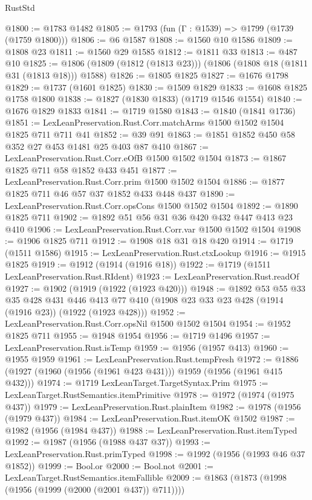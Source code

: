 \begin{lexlean}{RustStd}
\begin{coremodule}
@1800 := @1783 @1482
@1805 := @1793 (fun (Γ : @1539) => @1799 (@1739 (@1759 @1800)))
@1806 := @6 @1587
@1808 := @1560 @10 @1586
@1809 := @1808 @23
@1811 := @1560 @29 @1585
@1812 := @1811 @33
@1813 := @487 @10
@1825 := @1806 (@1809 (@1812 (@1813 @23))) (@1806 (@1808 @18 (@1811 @31 (@1813 @18))) @1588)
@1826 := @1805 @1825
@1827 := @1676 @1798
@1829 := @1737 (@1601 @1825)
@1830 := @1509 @1829
@1833 := @1608 @1825 @1758 @1800
@1838 := @1827 (@1830 @1833) (@1719 @1546 @1554)
@1840 := @1676 @1829 @1833
@1841 := @1719 @1580
@1843 := @1840 (@1841 @1736)
@1851 := LexLeanPreservation.Rust.Corr.matchArms @1500 @1502 @1504 @1825 @711 @711 @41
@1852 := @39 @91
@1863 := @1851 @1852 @450 @58 @352 @27 @453 @1481 @25 @403 @87 @410
@1867 := LexLeanPreservation.Rust.Corr.eOfB @1500 @1502 @1504
@1873 := @1867 @1825 @711 @58 @1852 @433 @451
@1877 := LexLeanPreservation.Rust.Corr.prim @1500 @1502 @1504
@1886 := @1877 @1825 @711 @46 @57 @37 @1852 @433 @448 @437
@1890 := LexLeanPreservation.Rust.Corr.opsCons @1500 @1502 @1504
@1892 := @1890 @1825 @711
@1902 := @1892 @51 @56 @31 @36 @420 @432 @447 @413 @23 @410
@1906 := LexLeanPreservation.Rust.Corr.var @1500 @1502 @1504
@1908 := @1906 @1825 @711
@1912 := @1908 @18 @31 @18 @420
@1914 := @1719 (@1511 @1586)
@1915 := LexLeanPreservation.Rust.ctxLookup
@1916 := @1915 @1825
@1919 := @1912 (@1914 (@1916 @18))
@1922 := @1719 (@1511 LexLeanPreservation.Rust.RIdent)
@1923 := LexLeanPreservation.Rust.readOf
@1927 := @1902 (@1919 (@1922 (@1923 @420)))
@1948 := @1892
    @53
    @55
    @33
    @35
    @428
    @431
    @446
    @413
    @77
    @410
    (@1908 @23 @33 @23 @428 (@1914 (@1916 @23)) (@1922 (@1923 @428)))
@1952 := LexLeanPreservation.Rust.Corr.opsNil @1500 @1502 @1504
@1954 := @1952 @1825 @711
@1955 := @1948 @1954
@1956 := @1719 @1496
@1957 := LexLeanPreservation.Rust.isTemp
@1959 := @1956 (@1957 @413)
@1960 := @1955 @1959
@1961 := LexLeanPreservation.Rust.tempFresh
@1972 := @1886 (@1927 (@1960 (@1956 (@1961 @423 @431))) @1959 (@1956 (@1961 @415 @432)))
@1974 := @1719 LexLeanTarget.TargetSyntax.Prim
@1975 := LexLeanTarget.RustSemantics.itemPrimitive
@1978 := @1972 (@1974 (@1975 @437))
@1979 := LexLeanPreservation.Rust.plainItem
@1982 := @1978 (@1956 (@1979 @437))
@1984 := LexLeanPreservation.Rust.itemOK @1502
@1987 := @1982 (@1956 (@1984 @437))
@1988 := LexLeanPreservation.Rust.itemTyped
@1992 := @1987 (@1956 (@1988 @437 @37))
@1993 := LexLeanPreservation.Rust.primTyped
@1998 := @1992 (@1956 (@1993 @46 @37 @1852))
@1999 := Bool.or
@2000 := Bool.not
@2001 := LexLeanTarget.RustSemantics.itemFallible
@2009 := @1863 (@1873 (@1998 (@1956 (@1999 (@2000 (@2001 @437)) @711))))

\end{coremodule}
\end{lexlean}
